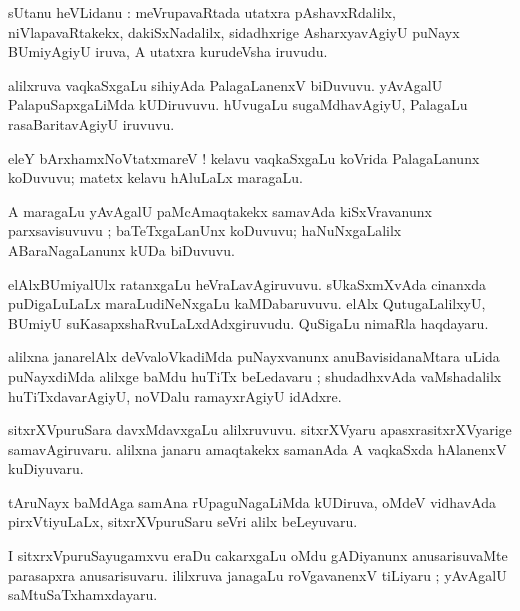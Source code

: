 \documentclass{article}
\begin{document}
\begin{mn}
sUtanu heVLidanu : meVrupavaRtada utatxra pAshavxRdalilx, niVlapavaRtakekx, dakiSxNadalilx,
sidadhxrige AsharxyavAgiyU puNayx BUmiyAgiyU iruva, A utatxra kurudeVsha iruvudu.
\end{mn}

\begin{mn}
alilxruva vaqkaSxgaLu sihiyAda PalagaLanenxV biDuvuvu.
yAvAgalU PalapuSapxgaLiMda kUDiruvuvu. hUvugaLu sugaMdhavAgiyU,
PalagaLu rasaBaritavAgiyU iruvuvu.
\end{mn}

\begin{mn}
eleY bArxhamxNoVtatxmareV ! kelavu vaqkaSxgaLu koVrida PalagaLanunx
koDuvuvu; matetx kelavu hAluLaLx maragaLu.
\end{mn}

\begin{mn}
A maragaLu yAvAgalU paMcAmaqtakekx samavAda kiSxVravanunx parxsavisuvuvu ; 
baTeTxgaLanUnx koDuvuvu; haNuNxgaLalilx ABaraNagaLanunx kUDa biDuvuvu.
\end{mn}

\begin{mn}
elAlxBUmiyalUlx ratanxgaLu heVraLavAgiruvuvu.
sUkaSxmXvAda cinanxda puDigaLuLaLx	maraLudiNeNxgaLu kaMDabaruvuvu.
elAlx QutugaLalilxyU, BUmiyU suKasapxshaRvuLaLxdAdxgiruvudu. 
QuSigaLu nimaRla haqdayaru.
\end{mn}

\begin{mn}
alilxna janarelAlx deVvaloVkadiMda puNayxvanunx anuBavisidanaMtara uLida 
puNayxdiMda alilxge baMdu huTiTx beLedavaru ;
shudadhxvAda vaMshadalilx huTiTxdavarAgiyU, noVDalu ramayxrAgiyU idAdxre.
\end{mn}

\begin{mn}
sitxrXVpuruSara davxMdavxgaLu alilxruvuvu. sitxrXVyaru 
apasxrasitxrXVyarige samavAgiruvaru. alilxna janaru amaqtakekx 
samanAda A vaqkaSxda hAlanenxV kuDiyuvaru.
\end{mn}

\begin{mn}
tAruNayx baMdAga samAna rUpaguNagaLiMda kUDiruva, oMdeV vidhavAda pirxVtiyuLaLx, 
sitxrXVpuruSaru seVri alilx beLeyuvaru.
\end{mn}

\begin{mn}
I sitxrxVpuruSayugamxvu eraDu cakarxgaLu oMdu gADiyanunx anusarisuvaMte 
parasapxra anusarisuvaru. ililxruva janagaLu roVgavanenxV tiLiyaru ; 
yAvAgalU saMtuSaTxhamxdayaru. 
\end{mn}
\end{document}
